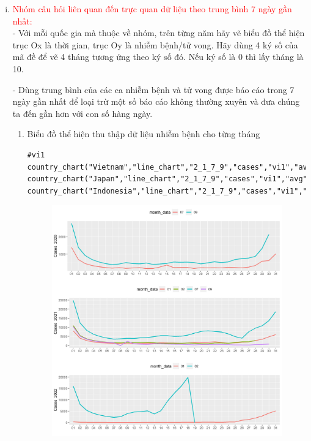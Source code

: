 \documentclass[a4paper]{article}
\theoremstyle{definition}
\begin{document}
\begin{enumerate}[i)]
\item \textcolor{red}{Nhóm câu hỏi liên quan đến trực quan dữ liệu theo trung bình 7 ngày gần nhất:}\\
- Với mỗi quốc gia mà thuộc về nhóm, trên từng năm hãy vẽ biểu đồ thể hiện trục Ox là thời gian, trục Oy là nhiễm bệnh/tử vong. Hãy dùng 4 ký số của mã đề để vẽ 4 tháng tương ứng theo ký số đó. Nếu ký số là 0 thì lấy tháng là 10.

- Dùng trung bình của các ca nhiễm bệnh và tử vong được báo cáo trong 7 ngày gần nhất để loại trừ một số báo cáo không thường xuyên và đưa chúng ta đến gần hơn với con số hàng ngày.

\begin{enumerate}[1)]
    \item Biểu đồ thể hiện thu thập dữ liệu nhiễm bệnh cho từng tháng
    \begin{lstlisting}[frame=single]  
#vi1
country_chart("Vietnam","line_chart","2_1_7_9","cases","vi1","avg")
country_chart("Japan","line_chart","2_1_7_9","cases","vi1","avg")
country_chart("Indonesia","line_chart","2_1_7_9","cases","vi1","avg")
		\end{lstlisting}	
		\begin{figure}[htp]
		    \centering
		    \includegraphics[scale = 0.7]{Images/VI/vi1 Indonesia .jpeg}

\end{figure}
\end{enumerate}
\end{enumerate}
\end{document}
